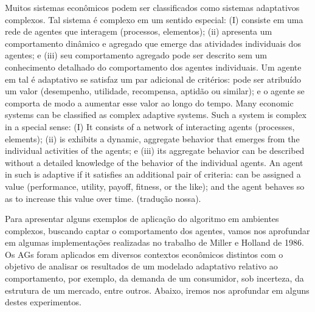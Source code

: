 \citacao
	{%
		Muitos sistemas econômicos podem ser classificados como sistemas adaptativos complexos. Tal sistema é complexo em um sentido especial: (I) consiste em uma rede de agentes que interagem (processos, elementos); (ii) apresenta um comportamento dinâmico e agregado que emerge das atividades individuais dos agentes; e (iii) seu comportamento agregado pode ser descrito sem um conhecimento detalhado do comportamento dos agentes individuais. Um agente em tal é adaptativo se satisfaz um par adicional de critérios: pode ser atribuído um valor (desempenho, utilidade, recompensa, aptidão ou similar); e o agente se comporta de modo a aumentar esse valor ao longo do tempo.
	}{%
		Many economic systems can be classified as complex adaptive systems. Such a system is complex in a special sense: (I) It consists of a network of interacting agents (processes, elements); (ii) is exhibits a dynamic, aggregate behavior that emerges from the individual activities of the agents; e (iii) its aggregate behavior can be described without a detailed knowledge of the behavior of the individual agents. An agent in such is adaptive if it satisfies an additional pair of criteria: can be assigned a value (performance, utility, payoff, fitness, or the like); and the agent behaves so as to increase this value over time.
	}
	{}
	{(tradução nossa).}

Para apresentar alguns exemplos de aplicação do algoritmo em ambientes complexos, buscando captar o comportamento dos agentes, vamos nos aprofundar em algumas implementações realizadas no trabalho de Miller e Holland de 1986. Os AGs foram aplicados em diversos contextos econômicos distintos com o objetivo de analisar os resultados de um modelado adaptativo relativo ao comportamento, por exemplo, da demanda de um consumidor, sob incerteza, da estrutura de um mercado, entre outros. Abaixo, iremos nos aprofundar em alguns destes experimentos.

